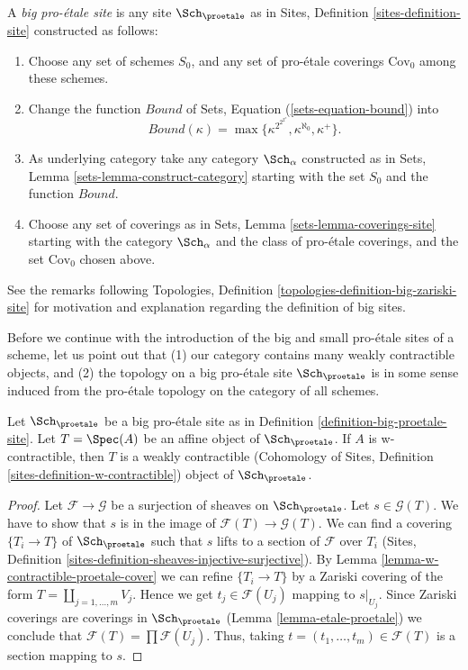 \begin{definition}
\label{definition-big-proetale-site}
A {\it big pro-\'etale site} is any site $\Sch_\proetale$ as in
Sites, Definition \ref{sites-definition-site} constructed as follows:
\begin{enumerate}
\item Choose any set of schemes $S_0$, and any set of pro-\'etale coverings
$\text{Cov}_0$ among these schemes.
\item Change the function $Bound$ of
Sets, Equation (\ref{sets-equation-bound}) into
$$
Bound(\kappa) = \max\{\kappa^{2^{2^{2^\kappa}}}, \kappa^{\aleph_0}, \kappa^+\}.
$$
\item As underlying category take any category $\Sch_\alpha$
constructed as in Sets, Lemma \ref{sets-lemma-construct-category}
starting with the set $S_0$ and the function $Bound$.
\item Choose any set of coverings as in
Sets, Lemma \ref{sets-lemma-coverings-site} starting with the
category $\Sch_\alpha$ and the class of pro-\'etale coverings,
and the set $\text{Cov}_0$ chosen above.
\end{enumerate}
\end{definition}

\noindent
See the remarks following
Topologies, Definition \ref{topologies-definition-big-zariski-site}
for motivation and explanation regarding the definition of big sites.

\medskip\noindent
Before we continue with the introduction of the big and small
pro-\'etale sites of a scheme, let us point out that (1) our category
contains many weakly contractible objects, and (2) the topology on a
big pro-\'etale site $\Sch_\proetale$ is in some sense induced from
the pro-\'etale topology on the category of all schemes.

\begin{lemma}
\label{lemma-w-contractible-is-weakly-contractible}
Let $\Sch_\proetale$ be a big pro-\'etale site as in
Definition \ref{definition-big-proetale-site}.
Let $T = \Spec(A)$ be an affine object of $\Sch_\proetale$.
If $A$ is w-contractible, then $T$ is a weakly contractible
(Cohomology of Sites, Definition
\ref{sites-definition-w-contractible})
object of $\Sch_\proetale$.
\end{lemma}

\begin{proof}
Let $\mathcal{F} \to \mathcal{G}$ be a surjection of sheaves on
$\Sch_\proetale$. Let $s \in \mathcal{G}(T)$. We have to show that
$s$ is in the image of $\mathcal{F}(T) \to \mathcal{G}(T)$. We can find a
covering $\{T_i \to T\}$ of $\Sch_\proetale$ such that $s$ lifts
to a section of $\mathcal{F}$ over $T_i$
(Sites, Definition \ref{sites-definition-sheaves-injective-surjective}).
By Lemma \ref{lemma-w-contractible-proetale-cover}
we can refine $\{T_i \to T\}$ by a Zariski
covering of the form $T = \coprod_{j = 1, \ldots, m} V_j$.
Hence we get $t_j \in \mathcal{F}(U_j)$ mapping to $s|_{U_j}$.
Since Zariski coverings are coverings in $\Sch_\proetale$
(Lemma \ref{lemma-etale-proetale}) we conclude that
$\mathcal{F}(T) = \prod \mathcal{F}(U_j)$.
Thus, taking $t = (t_1, \ldots, t_m) \in \mathcal{F}(T)$
is a section mapping to $s$.
\end{proof}

